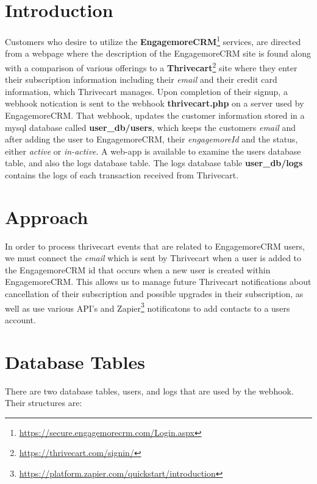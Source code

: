 \documentclass[final,letterpaper,12pt]{article}
\begin{document}
\section{Introduction}
\noindent Customers who desire to utilize the {\bf EngagemoreCRM}\footnote{\url{https://secure.engagemorecrm.com/Login.aspx}} services, are directed from a webpage
where the description of the EngagemoreCRM site is found along with a comparison of various offerings
to a {\bf Thrivecart}\footnote{\url{https://thrivecart.com/signin/}} site where they enter their subscription information including their {\it email} and their credit card information, which Thrivecart manages.
Upon completion of their signup, a webhook notication is sent to the webhook {\bf thrivecart.php} on
a server used by EngagemoreCRM.  That webhook, updates the customer information stored in a mysql
database called {\bf user\_db/users}, which keeps the customers {\it email} and after adding the user to EngagemoreCRM,
their {\it engagemoreId} and the status, either {\it active} or {\it in-active}.  A web-app is available to examine the users database table, and also
the logs database table. The logs database table {\bf user\_db/logs} contains the logs of each transaction received
from Thrivecart.


\section{Approach}
\noindent In order to process thrivecart events that are related to EngagemoreCRM users, we must connect
the {\it email} which is sent by Thrivecart when a user is added to the EngagemoreCRM  id that
occurs when a new user is created within EngagemoreCRM.  This allows us to manage future Thrivecart
notifications about cancellation of their subscription and possible upgrades in their subscription, as well as use various API's and Zapier\footnote{\url{https://platform.zapier.com/quickstart/introduction}} notificatons to add contacts to a users account.

\newpage
\section{Database Tables}
\noindent There are two database tables, users, and logs that are used by the webhook.  Their structures are:
\smallskip
\end{document}
